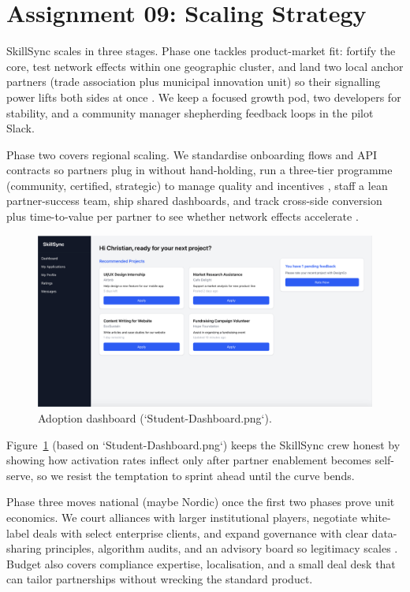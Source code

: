 \section*{Assignment 09: Scaling Strategy}

SkillSync scales in three stages. Phase one tackles product-market fit: fortify the core, test network effects within one geographic cluster, and land two local anchor partners (trade association plus municipal innovation unit) so their signalling power lifts both sides at once \citep{Choudary2016,Reillier2017}. We keep a focused growth pod, two developers for stability, and a community manager shepherding feedback loops in the pilot Slack.

Phase two covers regional scaling. We standardise onboarding flows and API contracts so partners plug in without hand-holding, run a three-tier programme (community, certified, strategic) to manage quality and incentives \citep{HagiuWright2013}, staff a lean partner-success team, ship shared dashboards, and track cross-side conversion plus time-to-value per partner to see whether network effects accelerate \citep{ShapiroVarian1999,Lecture12}.

\begin{figure}[h]
  \centering
  \includegraphics[width=0.75\linewidth]{figures/Student-Dashboard.png}
  \caption{Adoption dashboard (`Student-Dashboard.png`).}
  \label{fig:scaling-dashboard}
\end{figure}

Figure~\ref{fig:scaling-dashboard} (based on `Student-Dashboard.png`) keeps the SkillSync crew honest by showing how activation rates inflect only after partner enablement becomes self-serve, so we resist the temptation to sprint ahead until the curve bends.

Phase three moves national (maybe Nordic) once the first two phases prove unit economics. We court alliances with larger institutional players, negotiate white-label deals with select enterprise clients, and expand governance with clear data-sharing principles, algorithm audits, and an advisory board so legitimacy scales \citep{Srnicek2017,Zuboff2019}. Budget also covers compliance expertise, localisation, and a small deal desk that can tailor partnerships without wrecking the standard product.

